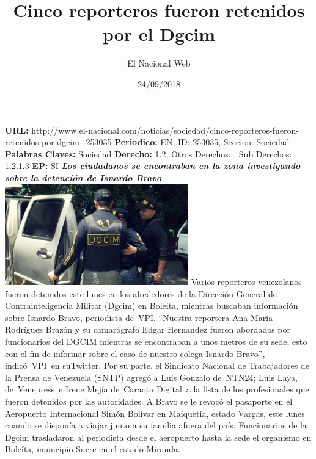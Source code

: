 \documentclass{article}%
\title{\textbf{Cinco reporteros fueron retenidos por el Dgcim}}%
\author{El Nacional Web}%
\date{24/09/2018}%
\begin{document}
%
\normalsize%
\maketitle%
\textbf{URL: }%
http://www.el{-}nacional.com/noticias/sociedad/cinco{-}reporteros{-}fueron{-}retenidos{-}por{-}dgcim\_253035\newline%
%
\textbf{Periodico: }%
EN, %
ID: %
253035, %
Seccion: %
Sociedad\newline%
%
\textbf{Palabras Claves: }%
Sociedad\newline%
%
\textbf{Derecho: }%
1.2, %
Otros Derechos: %
, %
Sub Derechos: %
1.2.1.3\newline%
%
\textbf{EP: }%
SI\newline%
\newline%
%
\textbf{\textit{Los ciudadanos se encontraban en la zona investigando sobre la detención de Isnardo Bravo}}%
\newline%
\newline%
%
\includegraphics[width=300px]{151.jpg}%
\newline%
%
Varios reporteros venezolanos fueron detenidos este lunes en los alrededores de la Dirección General de Contrainteligencia Militar (Dgcim) en Boleita, mientras buscaban información sobre Isnardo Bravo, periodista de~VPI.%
\newline%
%
“Nuestra reportera Ana María Rodríguez Brazón y su camarógrafo Edgar Hernandez fueron abordados por funcionarios del DGCIM mientras se encontraban a unos metros de su sede, esto con el fin de informar sobre el caso de nuestro colega Isnardo Bravo”, indicó~VPI~en suTwitter.%
\newline%
%
Por su parte, el Sindicato Nacional de Trabajadores de la Prensa de Venezuela (SNTP) agregó a Luis Gonzalo de~NTN24; Luis Laya, de~Venepress~e Irene Mejía de~Caraota Digital~a la lista de los profesionales que fueron detenidos por las autoridades.%
\newline%
%
A Bravo se le revocó el pasaporte en el Aeropuerto Internacional Simón Bolívar en Maiquetía, estado Vargas, este lunes cuando se disponía a viajar junto a su familia afuera del país.%
\newline%
%
Funcionarios de la Dgcim trasladaron al periodista desde el aeropuerto hasta la sede el organismo en Boleíta, municipio Sucre en el estado Miranda.%
\newline%
%
\end{document}
